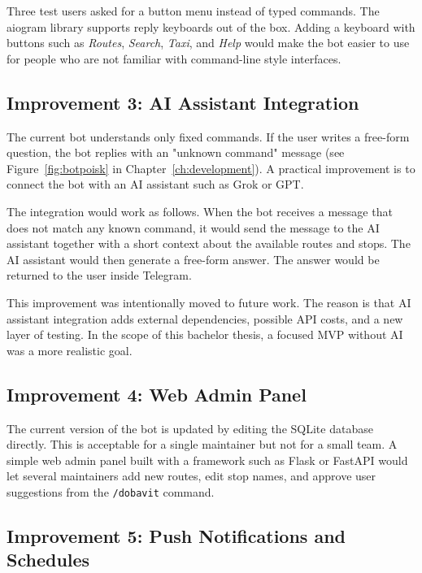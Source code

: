 Three test users asked for a button menu instead of typed commands. The
aiogram library supports reply keyboards out of the box. Adding a keyboard
with buttons such as \textit{Routes}, \textit{Search}, \textit{Taxi}, and
\textit{Help} would make the bot easier to use for people who are not
familiar with command-line style interfaces.

\subsection{Improvement 3: AI Assistant Integration}
\label{subsec:ai}

The current bot understands only fixed commands. If the user writes a
free-form question, the bot replies with an "unknown command" message
(see Figure~\ref{fig:botpoisk} in Chapter~\ref{ch:development}). A
practical improvement is to connect the bot with an AI assistant such as
Grok or GPT.

The integration would work as follows. When the bot receives a message
that does not match any known command, it would send the message to the
AI assistant together with a short context about the available routes
and stops. The AI assistant would then generate a free-form answer. The
answer would be returned to the user inside Telegram.

This improvement was intentionally moved to future work. The reason is
that AI assistant integration adds external dependencies, possible API
costs, and a new layer of testing. In the scope of this bachelor thesis,
a focused MVP without AI was a more realistic goal.

\subsection{Improvement 4: Web Admin Panel}
\label{subsec:admin}

The current version of the bot is updated by editing the SQLite database
directly. This is acceptable for a single maintainer but not for a small
team. A simple web admin panel built with a framework such as Flask or
FastAPI would let several maintainers add new routes, edit stop names,
and approve user suggestions from the \texttt{/dobavit} command.

\subsection{Improvement 5: Push Notifications and Schedules}
\label{subsec:push}

